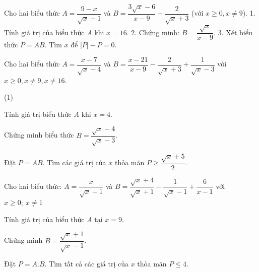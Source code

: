 \documentclass[12pt]{article}
\begin{document}
\begin{bt}
Cho hai biểu thức $A = \dfrac{9-x}{\sqrt{x}+1}$ và $B = \dfrac{3\sqrt{x}-6}{x-9} - \dfrac{2}{\sqrt{x}+3}$ (với $x \ge 0, x \ne 9$).
1. Tính giá trị của biểu thức $A$ khi $x = 16$.
2. Chứng minh: $B = \dfrac{\sqrt{x}}{x-9}$.
3. Xét biểu thức $P = AB$. Tìm $x$ để $|P| - P = 0$.
\end{bt}

\begin{bt}
Cho hai biểu thức $A = \dfrac{x-7}{\sqrt{x}-4}$ và $B = \dfrac{x-21}{x-9} - \dfrac{2}{\sqrt{x}+3} + \dfrac{1}{\sqrt{x}-3}$ với $x \ge 0, x \ne 9, x \ne 16$.
\begin{cacy}(1)
\item Tính giá trị biểu thức $A$ khi $x = 4$.
\item Chứng minh biểu thức $B = \dfrac{\sqrt{x}-4}{\sqrt{x}-3}$.
\item Đặt $P = AB$. Tìm các giá trị của $x$ thỏa mãn $P \ge \dfrac{\sqrt{x}+5}{2}$.
\end{cacy}
\loigiai{}
\end{bt}

\begin{bt}
Cho hai biểu thức:
$A = \dfrac{x}{\sqrt{x}+1}$ và $B = \dfrac{\sqrt{x}+4}{\sqrt{x}+1} - \dfrac{1}{\sqrt{x}-1} + \dfrac{6}{x-1}$ với $x \ge 0;\ x \ne 1$
\begin{cacy}
\item Tính giá trị của biểu thức $A$ tại $x = 9$.
\item Chứng minh $B = \dfrac{\sqrt{x}+1}{\sqrt{x}-1}$.
\item Đặt $P = A.B$. Tìm tất cả các giá trị của $x$ thỏa mãn $P \le 4$.
\end{cacy}
\loigiai{}
\end{bt}
\end{document}
